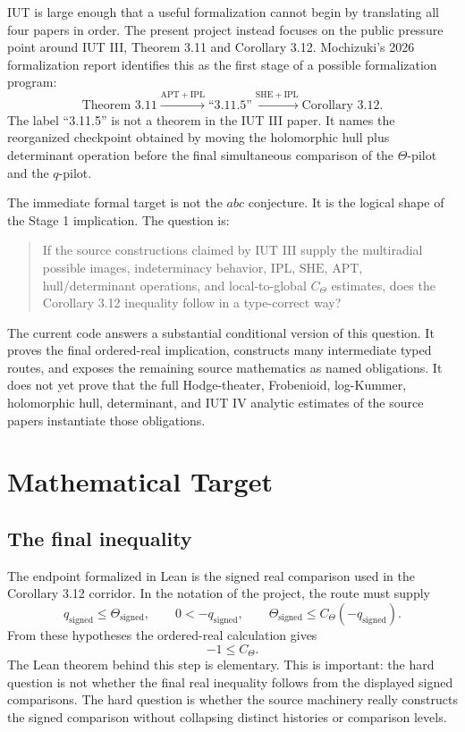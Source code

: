 \documentclass[11pt]{article}
\newcommand{\IUT}{IUT}
\newcommand{\Lean}{Lean}
\newcommand{\CTheta}{C_\Theta}
\newcommand{\ThetaPilot}{\ensuremath{\Theta}\nobreakdash-pilot}
\newcommand{\qPilot}{\ensuremath{q}\nobreakdash-pilot}
\newcommand{\SHE}{\ensuremath{\mathrm{SHE}}}
\newcommand{\IPL}{\ensuremath{\mathrm{IPL}}}
\newcommand{\APT}{\ensuremath{\mathrm{APT}}}
\theoremstyle{plain}
\theoremstyle{definition}
\theoremstyle{remark}
\begin{document}
\IUT{} is large enough that a useful formalization cannot begin by translating
all four papers in order.  The present project instead focuses on the public
pressure point around \IUT{} III, Theorem 3.11 and Corollary 3.12.  Mochizuki's
2026 formalization report identifies this as the first stage of a possible
formalization program:
\[
\text{Theorem 3.11}
  \xrightarrow{\APT+\IPL}
\text{``3.11.5''}
  \xrightarrow{\SHE+\IPL}
\text{Corollary 3.12}.
\]
The label ``3.11.5'' is not a theorem in the \IUT{} III paper.  It names the
reorganized checkpoint obtained by moving the holomorphic hull plus determinant
operation before the final simultaneous comparison of the \ThetaPilot{} and the
\qPilot{}.

The immediate formal target is not the \(abc\) conjecture.  It is the logical
shape of the Stage 1 implication.  The question is:

\begin{quote}
If the source constructions claimed by \IUT{} III supply the multiradial
possible images, indeterminacy behavior, \(\IPL\), \(\SHE\), \(\APT\),
hull/determinant operations, and local-to-global \(\CTheta\) estimates, does the
Corollary 3.12 inequality follow in a type-correct way?
\end{quote}

The current code answers a substantial conditional version of this question.
It proves the final ordered-real implication, constructs many intermediate
typed routes, and exposes the remaining source mathematics as named
obligations.  It does not yet prove that the full Hodge-theater, Frobenioid,
log-Kummer, holomorphic hull, determinant, and \IUT{} IV analytic estimates of
the source papers instantiate those obligations.

\section{Mathematical Target}

\subsection{The final inequality}

The endpoint formalized in \Lean{} is the signed real comparison used in the
Corollary 3.12 corridor.  In the notation of the project, the route must supply
\[
  q_{\mathrm{signed}} \leq \Theta_{\mathrm{signed}},
  \qquad
  0 < -q_{\mathrm{signed}},
  \qquad
  \Theta_{\mathrm{signed}} \leq \CTheta(-q_{\mathrm{signed}}).
\]
From these hypotheses the ordered-real calculation gives
\[
  -1 \leq \CTheta.
\]
The Lean theorem behind this step is elementary.  This is important: the hard
question is not whether the final real inequality follows from the displayed
signed comparisons.  The hard question is whether the source machinery really
constructs the signed comparison without collapsing distinct histories or
comparison levels.
\end{document}
